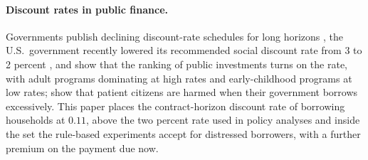 \paragraph{Discount rates in public finance.} Governments publish declining discount-rate schedules for long horizons \citep{arrow_should_2014}, the U.S.\ government recently lowered its recommended social discount rate from 3 to 2 percent \citep{the_white_house_biden-harris_2023}, and \citet{hendren_unified_2020} show that the ranking of public investments turns on the rate, with adult programs dominating at high rates and early-childhood programs at low rates; \citet{demarzo_sovereign_2023} show that patient citizens are harmed when their government borrows excessively. This paper places the contract-horizon discount rate of borrowing households at $0.11$, above the two percent rate used in policy analyses and inside the set the rule-based experiments accept for distressed borrowers, with a further premium on the payment due now.
